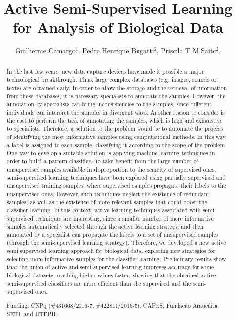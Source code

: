 \documentclass[twoside]{article}
\title{\vspace{-15mm}\fontsize{24pt}{10pt}\selectfont\textbf{ Active Semi-Supervised Learning for Analysis of Biological Data }} %
\author{ Guilherme Camargo$^{1}$, Pedro Henrique Bugatti$^{2}$, Priscila T M Saito$^{2}$, }
\affil{ 1 Programa de Pós-Graduação em Bioinformática – PPGBIOINFO, Universidade Tecnológica Federal do Paraná, Cornélio Procópio

2 Federal University of Technology – Parana

 }
\date{}
\begin{document}
  
  
  \maketitle %
  
  
  \thispagestyle{fancy} %
  
  
  \begin{abstract}
  In the last few years, new data capture devices have made it possible a major technological breakthrough. Thus, large complex databases (e.g. images, sounds or texts) are obtained daily. In order to allow the storage and the retrieval of information from these databases, it is necessary specialists to annotate the samples. However, the annotation by specialists can bring inconsistencies to the samples, since different individuals can interpret the samples in divergent ways. Another reason to consider is the cost to perform the task of annotating the samples, which is high and exhaustive to specialists. Therefore, a solution to the problem would be to automate the process of identifying the most informative samples using computational methods. In this way, a label is assigned to each sample, classifying it according to the scope of the problem. One way to develop a suitable solution is applying machine learning techniques in order to build a pattern classifier. To take benefit from the large number of unsupervised samples available in disproportion to the scarcity of supervised ones, semi-supervised learning techniques have been explored using partially supervised and unsupervised training samples, where supervised samples propagate their labels to the unsupervised ones. However, such techniques neglect the existence of redundant samples, as well as the existence of more relevant samples that could boost the classifier learning. In this context, active learning techniques associated with semi-supervised techniques are interesting, since a smaller number of more informative samples automatically selected through the active learning strategy, and then annotated by a specialist can propagate the labels to a set of unsupervised samples (through the semi-supervised learning strategy). Therefore, we developed a new active semi-supervised learning approach for biological data, exploring new strategies for selecting more informative samples for the classifier learning. Preliminary results show that the union of active and semi-supervised learning improves accuracy for some biological datasets, reaching higher values faster, showing that the obtained active semi-supervised classifiers are more efficient than the supervised and the semi-supervised ones.
  
  Funding: CNPq (\#431668/2016-7, \#422811/2016-5), CAPES, Funda\c{c}\~ao Arauc\'aria, SETI, and UTFPR. \\ 
  \end{abstract}
  
\end{document}
